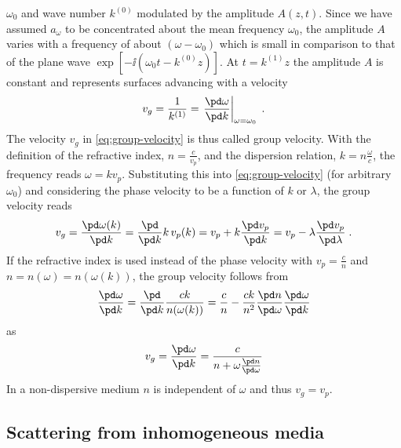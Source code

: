 \documentclass[
twoside,
openright,
titlepage,
numbers=noenddot,
headinclude,
fleqn,
a4paper,
footinclude=true,
cleardoublepage=empty,
abstractoff,
BCOR=5mm,
paper=a4,
fontsize=11pt,
british,ngerman,american,
]{scrreprt}
\begin{document}
$\omega_0$ and wave number $k^{(0)}$ modulated by the amplitude
$A(z,t)$.  Since we have assumed $a_\omega$ to be concentrated about
the mean frequency $\omega_0$, the amplitude $A$ varies with a
frequency of about $(\omega-\omega_0)$ which is small in comparison to
that of the plane wave $\exp[-\ii(\omega_0t -k^{(0)} z)]$.  At
$t=k^{(1)}z$ the amplitude $A$ is constant and represents surfaces
advancing with a velocity
\begin{equation}
  \label{eq:group-velocity}
  v_g= \frac{1}{k^{(1)}}  
  =\left.\frac{\pd\omega}{\pd k}\right|_{\omega=\omega_0} \;.
\end{equation}
The velocity $v_g$ in \cref{eq:group-velocity} is thus called group
velocity.  With the definition of the refractive index,
$n=\frac{c}{v_p}$, and the dispersion relation, $k=n\frac{\omega}{c}$,
the frequency reads $\omega=k v_p$.  Substituting this into
\cref{eq:group-velocity} (for arbitrary $\omega_0$) and considering
the phase velocity to be a function of $k$ or $\lambda$, the group
velocity reads
\begin{equation}
  \label{eq:group-velocity-1}
  v_{g} = \frac{\pd \omega(k)}{\pd k} 
  = \frac{\pd}{\pd k}k\,v_p(k) 
  = v_p + k \frac{\pd v_p}{\pd k}
  = v_p - \lambda \frac{\pd v_p}{\pd\lambda} \;.
\end{equation}
If the refractive index is used instead of the phase velocity with
$v_p=\frac{c}{n}$ and $n=n(\omega)=n(\omega(k))$, the group velocity
follows from
\begin{equation}
  \frac{\pd \omega}{\pd k} 
  = \frac{\pd}{\pd k} \frac{c k}{n(\omega(k))} 
  =  \frac{c}{n} 
  - \frac{c k}{n^2}\frac{\pd n}{\pd \omega}\frac{\pd \omega}{\pd k}
\end{equation}
as
\begin{equation}
  \label{eq:group-velocity-n}
  v_{g} = \frac{\pd \omega}{\pd k} 
  = \frac{c}{n+\omega\frac{\pd n}{\pd\omega}}  
\end{equation}
In a non-dispersive medium $n$ is independent of $\omega$ and thus
$v_g=v_p$.

\subsection{Scattering from inhomogeneous media}
\label{sec:inhomogeneous-media}
\end{document}
